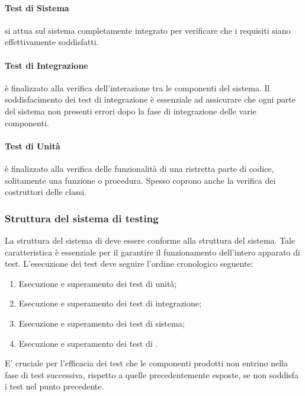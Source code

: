 \documentclass[12pt,a4paper]{article}
\begin{document}
	\paragraph{Test di Sistema} si attua sul sistema completamente integrato per verificare che i requisiti siano effettivamente soddisfatti.
	\paragraph{Test di Integrazione} è finalizzato alla verifica dell'interazione tra le componenti del sistema. Il soddisfacimento dei test di integrazione è essenziale ad assicurare che ogni parte del sistema non presenti errori dopo la fase di integrazione delle varie componenti.
	\paragraph{Test di Unità} è finalizzato alla verifica delle funzionalità di una ristretta parte di codice, solitamente una funzione o procedura. Spesso coprono anche la verifica dei costruttori delle classi.
\subsubsection{Struttura del sistema di testing}
La struttura del sistema di  deve essere conforme alla struttura del sistema. Tale caratteristica è essenziale per il garantire il funzionamento dell'intero apparato di test. L'esecuzione dei test deve seguire l'ordine cronologico seguente:
\begin{enumerate}
	\item Esecuzione e superamento dei test di unità;
	\item Esecuzione e superamento dei test di integrazione;
	\item Esecuzione e superamento dei test di sistema;
	\item Esecuzione e superamento dei test di .
\end{enumerate}
E' cruciale per l'efficacia dei test che le componenti prodotti non entrino nella fase di test successiva, rispetto a quelle precedentemente esposte, se non soddisfa i test nel punto precedente.
\end{document}
